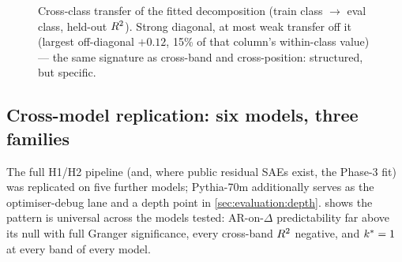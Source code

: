 \begin{figure}[t]
  \centering
  
  \caption{Cross-class transfer of the fitted decomposition (train class
  $\to$ eval class, held-out $R^2$). Strong diagonal, at most weak transfer
  off it (largest off-diagonal $+0.12$, 15\% of that column's within-class
  value) --- the same signature as cross-band and cross-position: structured,
  but specific.}
  \label{fig:crossclass}
\end{figure}

\subsection{Cross-model replication: six models, three families}
\label{sec:phase2:crossmodel}

The full H1/H2 pipeline (and, where public residual SAEs exist, the Phase-3
fit) was replicated on five further models; Pythia-70m additionally serves as
the optimiser-debug lane and a depth point in
\cref{sec:evaluation:depth}.  shows the pattern is
universal across the models tested: AR-on-$\Delta$ predictability far above
its null with full Granger significance, every cross-band $R^2$ negative,
and $k^{\ast} = 1$ at every band of every model.

